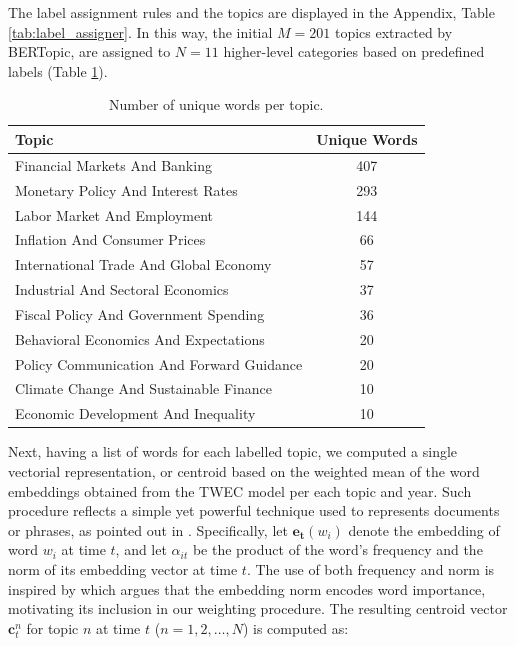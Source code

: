 The label assignment rules and the topics are displayed in the Appendix, Table \ref{tab:label_assigner}. In this way, the initial $M=201$ topics extracted by BERTopic, are assigned to $N=11$ higher-level categories based on predefined labels (Table \ref{tab:unique_words}).


\begin{table}[h!]
    \centering
    \caption{Number of unique words per topic.}
    \label{tab:unique_words}
    \begin{tabular}{l c}
        \hline
        \textbf{Topic} & \textbf{Unique Words} \\
        \hline
        Financial Markets And Banking & 407 \\
        Monetary Policy And Interest Rates & 293 \\
        Labor Market And Employment & 144 \\
        Inflation And Consumer Prices & 66 \\
        International Trade And Global Economy & 57 \\
        Industrial And Sectoral Economics & 37 \\
        Fiscal Policy And Government Spending & 36 \\
        Behavioral Economics And Expectations & 20 \\
        Policy Communication And Forward Guidance & 20 \\
        Climate Change And Sustainable Finance & 10 \\
        Economic Development And Inequality & 10 \\
        \hline
    \end{tabular}
\end{table}

Next, having a list of words for each labelled topic, we computed a single vectorial representation, or centroid based on the weighted mean of the word embeddings obtained from the TWEC model per each topic and year. Such procedure reflects a simple yet powerful technique used to represents documents or phrases, as pointed out in \cite{zhang2024word}. Specifically, let $\mathbf{e_t}(w_i)$ denote the embedding of word $w_i$ at time $t$, and let $\alpha_{it}$ be the product of the word's frequency and the norm of its embedding vector at time $t$. The use of both frequency and norm is inspired by \cite{oyama2023norm} which argues that the embedding norm encodes word importance, motivating its inclusion in our weighting procedure. The resulting centroid vector $\mathbf{c}_t^n$ for topic $n$ at time $t$ ($n=1,2,\dots,N$) is computed as:

